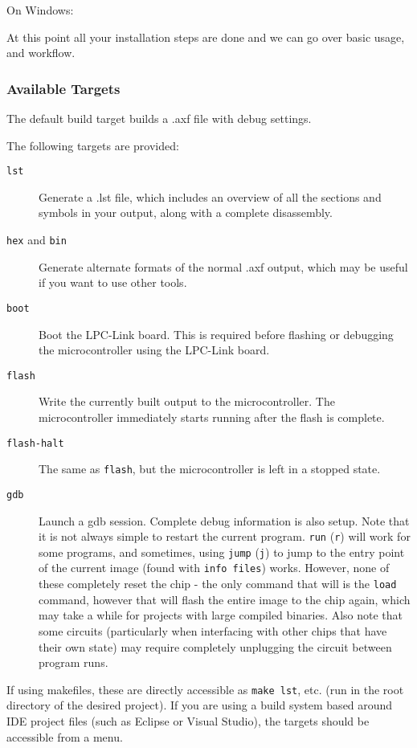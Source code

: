 \documentclass[]{article}
\begin{document}
On Windows:


At this point all your installation steps are done and we can go over
basic usage, and workflow.

\subsubsection{Available Targets}

The default build target builds a .axf file with debug settings.

The following targets are provided:

\begin{description}
\item[\texttt{lst}]
Generate a .lst file, which includes an overview of all the sections and
symbols in your output, along with a complete disassembly.
\item[\texttt{hex} and \texttt{bin}]
Generate alternate formats of the normal .axf output, which may be
useful if you want to use other tools.
\item[\texttt{boot}]
Boot the LPC-Link board. This is required before flashing or debugging
the microcontroller using the LPC-Link board.
\item[\texttt{flash}]
Write the currently built output to the microcontroller. The
microcontroller immediately starts running after the flash is complete.
\item[\texttt{flash-halt}]
The same as \texttt{flash}, but the microcontroller is left in a stopped
state.
\item[\texttt{gdb}]
Launch a gdb session. Complete debug information is also setup. Note
that it is not always simple to restart the current program.
\texttt{run} (\texttt{r}) will work for some programs, and sometimes,
using \texttt{jump} (\texttt{j}) to jump to the entry point of the
current image (found with \texttt{info files}) works. However, none of
these completely reset the chip - the only command that will is the
\texttt{load} command, however that will flash the entire image to the
chip again, which may take a while for projects with large compiled
binaries. Also note that some circuits (particularly when interfacing
with other chips that have their own state) may require completely
unplugging the circuit between program runs.
\end{description}

If using makefiles, these are directly accessible as \texttt{make lst},
etc. (run in the root directory of the desired project). If you are
using a build system based around IDE project files (such as Eclipse or
Visual Studio), the targets should be accessible from a menu.
\end{document}
